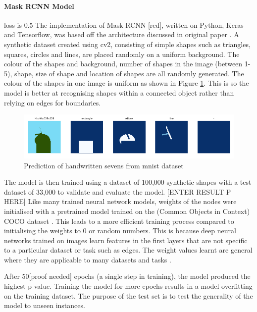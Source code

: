 \paragraph{Mask RCNN Model}
loss is 0.5
The implementation of Mask RCNN [red], written on Python, Keras and Tensorflow, was based off the architecture discussed in original paper \cite{he2017mask}. A synthetic dataset created using cv2, consisting of simple shapes such as triangles, squares, circles and lines, are placed randomly on a uniform background. The colour of the shapes and background, number of shapes in the image (between 1-5), shape, size of shape and location of shapes are all randomly generated. The colour of the shapes in one image is uniform as shown in Figure \ref{fig:dataset_ex}. This is so the model is better at recognising shapes within a connected object rather than relying on edges for boundaries. 
\begin{figure}[H]
	\begin{center}
		\includegraphics[width=160mm, scale=1]{maskrcnn_train.png}
		\caption{Prediction of handwritten sevens from mnist dataset}
		\label{fig:dataset_ex}
	\end{center}
	
\end{figure}


The model is then trained using a dataset of 100,000 synthetic shapes with a test dataset of 33,000 to validate and evaluate the model. [ENTER RESULT P HERE] Like many trained neural network models, weights of the nodes were initialised with a pretrained model trained on the (Common Objects in Context) COCO dataset \cite{lin2014microsoft}. This leads to a more efficient training process compared to initialising the weights to 0 or random numbers. This is because deep neural networks trained on images learn features in the first layers that are not specific to a particular dataset or task such as edges. The weight values learnt are general where they are applicable to many datasets and tasks \cite{yosinski2014transferable}.

After 50[proof needed] epochs (a single step in training), the model produced the highest p value. Training the model for more epochs results in a model overfitting on the training dataset. The purpose of the test set is to test the generality of the model to unseen instances.
 
